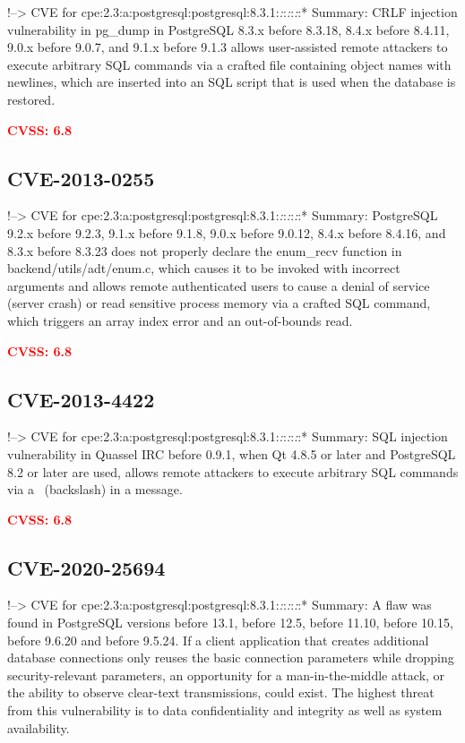 \documentclass[a4paper, 12pt]{article}
\begin{document}
!--\textgreater{} CVE for
cpe:2.3:a:postgresql:postgresql:8.3.1:\emph{:}:\emph{:}:\emph{:}:*
Summary: CRLF injection vulnerability in pg\_dump in PostgreSQL 8.3.x
before 8.3.18, 8.4.x before 8.4.11, 9.0.x before 9.0.7, and 9.1.x before
9.1.3 allows user-assisted remote attackers to execute arbitrary SQL
commands via a crafted file containing object names with newlines, which
are inserted into an SQL script that is used when the database is
restored.

\textbf{\textcolor{red}{CVSS: 6.8}}

\hypertarget{cve-2013-0255}{%
\subsection{CVE-2013-0255}\label{cve-2013-0255}}

!--\textgreater{} CVE for
cpe:2.3:a:postgresql:postgresql:8.3.1:\emph{:}:\emph{:}:\emph{:}:*
Summary: PostgreSQL 9.2.x before 9.2.3, 9.1.x before 9.1.8, 9.0.x before
9.0.12, 8.4.x before 8.4.16, and 8.3.x before 8.3.23 does not properly
declare the enum\_recv function in backend/utils/adt/enum.c, which
causes it to be invoked with incorrect arguments and allows remote
authenticated users to cause a denial of service (server crash) or read
sensitive process memory via a crafted SQL command, which triggers an
array index error and an out-of-bounds read.

\textbf{\textcolor{red}{CVSS: 6.8}}

\hypertarget{cve-2013-4422}{%
\subsection{CVE-2013-4422}\label{cve-2013-4422}}

!--\textgreater{} CVE for
cpe:2.3:a:postgresql:postgresql:8.3.1:\emph{:}:\emph{:}:\emph{:}:*
Summary: SQL injection vulnerability in Quassel IRC before 0.9.1, when
Qt 4.8.5 or later and PostgreSQL 8.2 or later are used, allows remote
attackers to execute arbitrary SQL commands via a ~(backslash) in a
message.

\textbf{\textcolor{red}{CVSS: 6.8}}

\hypertarget{cve-2020-25694}{%
\subsection{CVE-2020-25694}\label{cve-2020-25694}}

!--\textgreater{} CVE for
cpe:2.3:a:postgresql:postgresql:8.3.1:\emph{:}:\emph{:}:\emph{:}:*
Summary: A flaw was found in PostgreSQL versions before 13.1, before
12.5, before 11.10, before 10.15, before 9.6.20 and before 9.5.24. If a
client application that creates additional database connections only
reuses the basic connection parameters while dropping security-relevant
parameters, an opportunity for a man-in-the-middle attack, or the
ability to observe clear-text transmissions, could exist. The highest
threat from this vulnerability is to data confidentiality and integrity
as well as system availability.
\end{document}
